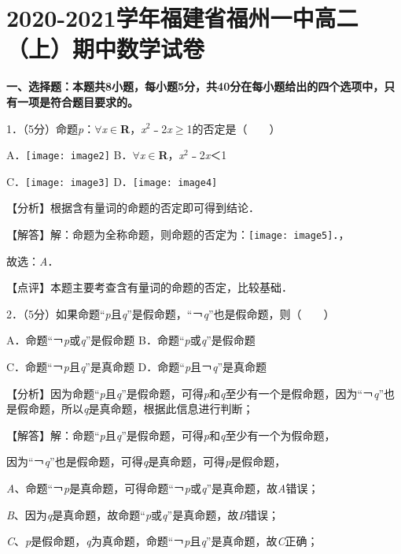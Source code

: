 \documentclass[a4paper,11pt,UTF8,twoside]{ctexart} %
\begin{document}
\section{2020-2021学年福建省福州一中高二（上）期中数学试卷}

\textbf{一、选择题：本题共8小题，每小题5分，共40分在每小题给出的四个选项中，只有一项是符合题目要求的。}

1．（5分）命题\textit{p}：$\mathrm{\forall }$\textit{x}$\mathrm{\in }$\textbf{R}，\textit{x}${}^{2}$﹣2\textit{x}$\mathrm{\ge}$1的否定是（　　）

A．\texttt{[image: image2]} B．$\mathrm{\forall }$\textit{x}$\mathrm{\in }$\textbf{R}，\textit{x}${}^{2}$﹣2\textit{x}＜1 

C．\texttt{[image: image3]} D．\texttt{[image: image4]}

【分析】根据含有量词的命题的否定即可得到结论．

【解答】解：命题为全称命题，则命题的否定为：\texttt{[image: image5]}．，

故选：\textit{A}．

【点评】本题主要考查含有量词的命题的否定，比较基础．

2．（5分）如果命题``\textit{p}且\textit{q}''是假命题，``￢\textit{q}''也是假命题，则（　　）

A．命题``￢\textit{p}或\textit{q}''是假命题 B．命题``\textit{p}或\textit{q}''是假命题 

C．命题``￢\textit{p}且\textit{q}''是真命题 D．命题``\textit{p}且￢\textit{q}''是真命题

【分析】因为命题``\textit{p}且\textit{q}''是假命题，可得\textit{p}和\textit{q}至少有一个是假命题，因为``￢\textit{q}''也是假命题，所以\textit{q}是真命题，根据此信息进行判断；

【解答】解：命题``\textit{p}且\textit{q}''是假命题，可得\textit{p}和\textit{q}至少有一个为假命题，

因为``￢\textit{q}''也是假命题，可得\textit{q}是真命题，可得\textit{p}是假命题，

\textit{A}、命题``￢\textit{p}是真命题，可得命题``￢\textit{p}或\textit{q}''是真命题，故\textit{A}错误；

\textit{B}、因为\textit{q}是真命题，故命题``\textit{p}或\textit{q}''是真命题，故\textit{B}错误；

\textit{C}、\textit{p}是假命题，\textit{q}为真命题，命题``￢\textit{p}且\textit{q}''是真命题，故\textit{C}正确；
\end{document}
